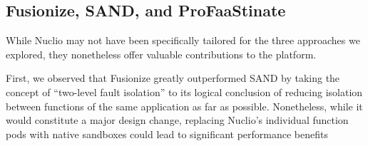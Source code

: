 
\subsection{Fusionize, SAND, and ProFaaStinate}


While Nuclio may not have been specifically tailored for the three approaches we explored, they nonetheless offer valuable contributions to the platform.

First, we observed that Fusionize greatly outperformed SAND by taking the concept of \enquote{two-level fault isolation} to its logical conclusion of reducing isolation between functions of the same application as far as possible.
Nonetheless, while it would constitute a major design change, replacing Nuclio's individual function pods with native sandboxes could lead to significant performance benefits


